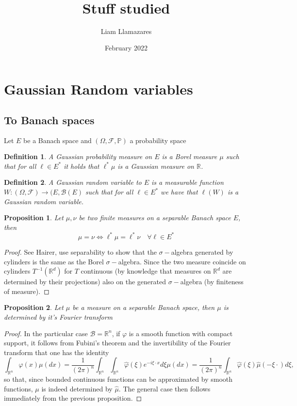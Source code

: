 \documentclass[12pt]{article}
\newcommand{\R}{{\mathbb R}}
\newtheorem{proposition}{Proposition}
\newtheorem{definition}{Definition}
\begin{document}
\title{Stuff studied}
\author{Liam Llamazares}
\date{February 2022}
\maketitle
\section{Gaussian Random variables}
\subsection{To Banach spaces}
Let $E$ be a Banach space and $(\Omega,\mathcal{F},\mathbb{P})$ a probability space
\begin{definition}
	A \emph{Gaussian probability measure on $E$} is a Borel measure $\mu$ such that  for all \(\ell\in E^*\) it holds that \(\ell^*\mu\)  is a Gaussian measure on $\R$.
\end{definition}
\begin{definition}
	A Gaussian random variable to $E$ is a measurable function \(W:(\Omega,\mathcal{F})\to (E,\mathcal{B}(E)\) such that for all \(\ell\in E^*\) we have that \(\ell(W)\) is a Gaussian random variable.
\end{definition}
\begin{proposition}
	Let $\mu,\nu$ be two finite measures on a separable Banach space $E$, then
	\begin{equation*}
		\mu=\nu\iff \ell^*\mu=\ell^*\nu\quad\forall \ell\in E^*
	\end{equation*}
\end{proposition}
\begin{proof}
	See Hairer, use separability to show that the $\sigma-$algebra generated by cylinders is the same as the Borel $\sigma-$algebra. Since the two measure coincide on cylinders $T^{-1}(\R^d)$ for $T$ continuous (by knowledge that measures on $\R^d$ are determined by their projections) also on the generated $\sigma-$algebra (by finiteness of measure).
\end{proof}
\begin{proposition}
	Let $\mu$ be a measure on a separable Banach space, then $\mu$ is determined by it's Fourier transform
\end{proposition}
\begin{proof}
	In the particular case $\mathcal{B}=\mathbb{R}^{n}$, if $\varphi$ is a smooth function with compact support, it follows from Fubini's theorem and the invertibility of the Fourier transform that one has the identity
	$$
		\int_{\mathbb{R}^{n}} \varphi(x) \mu(d x)=\frac{1}{(2 \pi)^{n}} \int_{\mathbb{R}^{n}} \int_{\mathbb{R}^{n}} \hat{\varphi}(\xi) e^{-i \xi\cdot x} d \xi \mu(d x)=\frac{1}{(2 \pi)^{n}} \int_{\mathbb{R}^{n}} \hat{\varphi}(\xi) \hat{\mu}(-\xi\cdot) d \xi,
	$$
	so that, since bounded continuous functions can be approximated by smooth functions, $\mu$ is indeed determined by $\hat{\mu}$. The general case then follows immediately from the previous proposition.
\end{proof}
\end{document}
